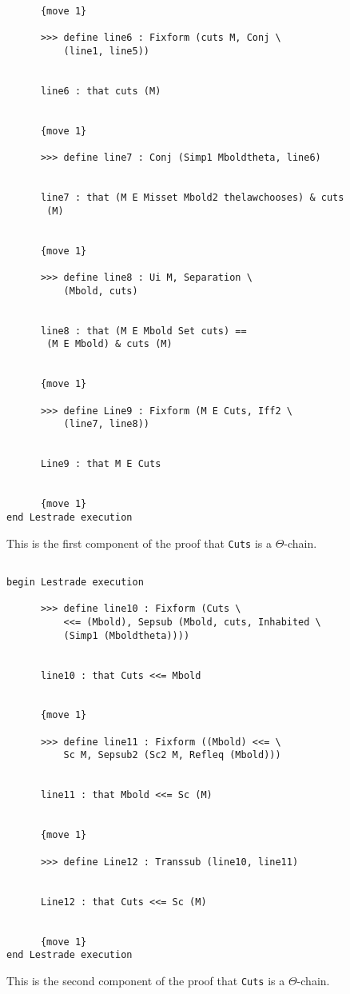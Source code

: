 \documentclass[12pt]{article}
\begin{document}
\begin{verbatim}
      {move 1}

      >>> define line6 : Fixform (cuts M, Conj \
          (line1, line5))


      line6 : that cuts (M)


      {move 1}

      >>> define line7 : Conj (Simp1 Mboldtheta, line6)


      line7 : that (M E Misset Mbold2 thelawchooses) & cuts 
       (M)


      {move 1}

      >>> define line8 : Ui M, Separation \
          (Mbold, cuts)


      line8 : that (M E Mbold Set cuts) == 
       (M E Mbold) & cuts (M)


      {move 1}

      >>> define Line9 : Fixform (M E Cuts, Iff2 \
          (line7, line8))


      Line9 : that M E Cuts


      {move 1}
end Lestrade execution
\end{verbatim}

This is the first component of the proof that {\tt Cuts} is a $\Theta$-chain.

\begin{verbatim}

begin Lestrade execution

      >>> define line10 : Fixform (Cuts \
          <<= (Mbold), Sepsub (Mbold, cuts, Inhabited \
          (Simp1 (Mboldtheta))))


      line10 : that Cuts <<= Mbold


      {move 1}

      >>> define line11 : Fixform ((Mbold) <<= \
          Sc M, Sepsub2 (Sc2 M, Refleq (Mbold)))


      line11 : that Mbold <<= Sc (M)


      {move 1}

      >>> define Line12 : Transsub (line10, line11)


      Line12 : that Cuts <<= Sc (M)


      {move 1}
end Lestrade execution
\end{verbatim}

This is the second component of the proof that {\tt Cuts} is a $\Theta$-chain.
\end{document}
